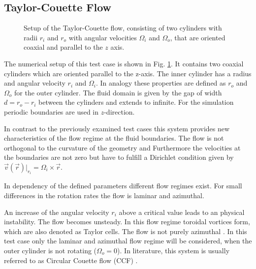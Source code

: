 \subsection{Taylor-Couette Flow}

\begin{figure}[!bp]
  \begin{minipage}[c]{0.6\textwidth}
      \centering
  \end{minipage}
  \begin{minipage}[c]{0.3\textwidth}
      \caption{Setup of the Taylor-Couette flow, consisting of  two cylinders with radii $r_i$ and $r_o$ with angular velocities $\Omega_i$ and $\Omega_o$, that are oriented coaxial
       and parallel to the $z$ axis.
      \label{validation:setup_tcflow}
      }
  \end{minipage}
\end{figure}

The numerical setup of this test case is shown in Fig. \ref{validation:setup_tcflow}.
It contains two coaxial cylinders which are oriented parallel to the z-axis.
The inner cylinder has a radius and angular velocity $r_i$ and $\Omega_i$. In analogy these properties are defined as
$r_o$ and $\Omega_o$ for the outer cylinder.
The fluid domain is given by the gap of width $d = r_o - r_i$ between the cylinders and extends to infinite.
For the simulation  periodic boundaries are used in $z$-direction.

In contrast to the previously examined test cases this system provides new characteristics
of the flow regime at the fluid boundaries. The flow is not orthogonal to the curvature of the geometry and
Furthermore the velocities at the boundaries are not zero but have to fulfill  a Dirichlet condition given by
$\vec{v}(\vec{r})|_{r_i}  = \Omega_i \times \vec{r}$.

In dependency of the defined parameters different flow regimes exist.
For small differences in the rotation rates the flow is laminar and azimuthal.

An increase of the angular velocity $r_i$ above a critical value leads to an physical instability. The flow becomes unsteady.
In this flow regime toroidal vortices form, which are also denoted as Taylor cells.
The flow is not purely azimuthal \citep{tritton88}.
In this test case only the laminar and azimuthal flow regime will be considered, when the outer cylinder is not rotating ($\Omega_o = 0$).
In literature, this system is usually referred to as Circular Couette flow (CCF) \citep{Kundu2012}.

